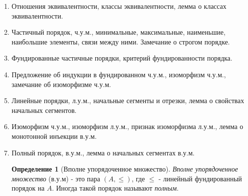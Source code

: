 \documentclass[a4paper]{article}
\theoremstyle{definition}
\newtheorem*{definition*}{Определение}
\begin{document}
\begin{enumerate}
       \begin{proof}
        \begin{enumerate}
         \item Покажем, что $f^{-1}$ - функция.\\ Пусть \mbox{$<y, x_1>, <y, x_2> \in f^{-1}$}. Тогда $<x_1, y>, <x_2, y>\in f$ и $f(x_1) = f(x_2) = y$. Поскольку $f$ инъективна, $x_1 = x_2$.\\
               Ясно, что $dom(f^{-1}) = ran(f)$ и $ran(f^{-1}) = dom(f)$. Поскольку $f$ сюръективна, $ran(f) = B = dom(f^{-1})$. Поскольку $ran(f^{-1}) = A$, $f^{-1}$ сюръективна. Инъективность $f^{-1}$ легко проверяется. Тем самым $f^{-1}: B\xrightarrow[\textit{на}]{1-1} A$.\\
               Покажем, что $f^{-1}(f(x)) = x$ при $x \in A$. Пусть  $x \in A$ и $y = f(x)$. Тогда $<x, y>\in f$ и $<y, x> \in f^{-1}$. Получаем, что $f^{-1}(y) = x$.
         \item выше доказано, что $g \circ f: A \rightarrow C$ и $[g \circ f](x) = g(f(x))$. Инъективность: если $g(f(x_1)) = g(f(x_2))$, то $f(x_1) = f(x_2)$ и отсюда $x_1 = x_2$. Сюръективность доказывается похожим способом.
        \end{enumerate}

       \end{proof}
 \item Отношения эквивалентности, классы эквивалентности, лемма о классах эквивалентности.
 \item Частичный порядок, ч.у.м., минимальные, максимальные, наименьшие, наибольшие элементы,
       связи между ними. Замечание о строгом порядке.
 \item Фундированные частичные порядки, критерий фундированности порядка.
 \item Предложение об индукции в фундированном ч.у.м., изоморфизм ч.у.м., замечание об изоморфизме ч.у.м.
 \item Линейные порядки, л.у.м., начальные сегменты и отрезки, лемма о свойствах начальных сегментов.
 \item Изоморфизм ч.у.м., изоморфизм л.у.м., признак изоморфизма л.у.м., лемма о монотонной инъекции в.у.м.
 \item Полный порядок, в.у.м., лемма о начальных сегментах в.у.м.
       \begin{definition*}[Вполне упорядоченное множество]
        \textit{Вполне упорядоченное множество} (в.у.м) - это пара $(A, \leq)$, где $\leq$ - линейный фундированный порядок на $A$. Иногда такой порядок называют \textit{полным}.
       \end{definition*}


\end{enumerate}
\end{document}
